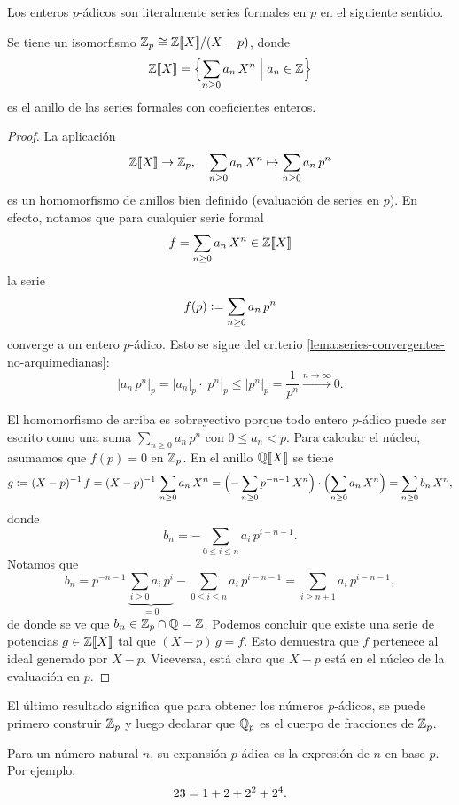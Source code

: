 \documentclass{article}
\numberwithin{equation}{section}
\theoremstyle{definition}
\begin{document}
Los enteros $p$-ádicos son literalmente series formales en $p$ en el siguiente
sentido.

\begin{corolario}
  Se tiene un isomorfismo $\mathbb{Z}_p \cong \mathbb{Z} [\![X]\!]/(X-p)$, donde
  $$\mathbb{Z} [\![X]\!] = \Bigl\{ \sum_{n\ge 0} a_n\,X^n \Bigm| a_n \in \mathbb{Z} \Bigr\}$$
  es el anillo de las series formales con coeficientes enteros.

  \begin{proof}
    La aplicación
    $$\mathbb{Z} [\![X]\!] \to \mathbb{Z}_p, \quad \sum_{n\ge 0} a_n\,X^n \mapsto \sum_{n\ge 0} a_n\,p^n$$
    es un homomorfismo de anillos bien definido (evaluación de series en
    $p$). En efecto, notamos que para cualquier serie formal
    $$f = \sum_{n\ge 0} a_n\,X^n \in \mathbb{Z} [\![X]\!]$$
    la serie
    $$f (p) \mathrel{\mathop:}= \sum_{n\ge 0} a_n\,p^n$$
    converge a un entero $p$-ádico. Esto se sigue del criterio
    \ref{lema:series-convergentes-no-arquimedianas}:
    \[ |a_n\,p^n|_p =
       |a_n|_p\cdot |p^n|_p \le |p^n|_p =
       \frac{1}{p^n} \xrightarrow{n \to \infty} 0. \]

    El homomorfismo de arriba es sobreyectivo porque todo entero $p$-ádico puede
    ser escrito como una suma $\sum_{n\ge 0} a_n\,p^n$ con $0 \le a_n < p$.
    Para calcular el núcleo, asumamos que $f (p) = 0$ en $\mathbb{Z}_p$. En el anillo
    $\mathbb{Q} [\![X]\!]$ se tiene
    \[ g \mathrel{\mathop:}= (X-p)^{-1}\,f =
       (X-p)^{-1}\,\sum_{n\ge 0} a_n\,X^n =
       \Bigl(-\sum_{n\ge 0} p^{-n-1}\,X^n\Bigr)\cdot \Bigl(\sum_{n\ge 0} a_n\,X^n\Bigr) =
       \sum_{n\ge 0} b_n\,X^n, \]
    donde
    $$b_n = -\sum_{0 \le i \le n} a_i\,p^{i-n-1}.$$
    Notamos que
    \[ b_n = p^{-n-1}\,\underbrace{\sum_{i\ge 0} a_i\,p^i}_{=0}
                 - \sum_{0\le i\le n} a_i\,p^{i-n-1}
           = \sum_{i\ge n+1} a_i\,p^{i-n-1}, \]
    de donde se ve que $b_n \in \mathbb{Z}_p \cap \mathbb{Q} = \mathbb{Z}$. Podemos concluir que
    existe una serie de potencias $g \in \mathbb{Z} [\![X]\!]$ tal que
    $(X-p)\,g = f$. Esto demuestra que $f$ pertenece al ideal generado por
    $X-p$. Viceversa, está claro que $X-p$ está en el núcleo de la evaluación
    en $p$.
  \end{proof}
\end{corolario}

El último resultado significa que para obtener los números $p$-ádicos, se puede
primero construir $\mathbb{Z}_p$ y luego declarar que $\mathbb{Q}_p$ es el cuerpo de
fracciones de $\mathbb{Z}_p$.

\begin{ejemplo}
  Para un número natural $n$, su expansión $p$-ádica es la expresión de $n$ en
  base $p$. Por ejemplo,
  \[ 23 = 1 + 2 + 2^2 + 2^4. \qedhere \]
\end{ejemplo}
\end{document}
